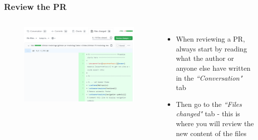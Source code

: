 \documentclass[aspectratio=169]{beamer} %
\begin{document}
\begin{frame}
	\frametitle{Review the PR}
	\begin{columns}[c]
	
		\vspace{-.75cm}
		\begin{figure}
			\centering
			\includegraphics[width=\textwidth]{./img/review-1.png}
		\end{figure}	
		
		\begin{itemize}
			\setlength\itemsep{2em}
			\item When reviewing a PR, always start by reading what the author or anyone else have written in the \textit{``Conversation"} tab
			\item Then go to the \textit{``Files changed"} tab - this is where you will review the new content of the files
		\end{itemize}
		
	\end{columns}
\end{frame}
\end{document}
